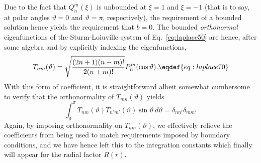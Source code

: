 Due to the fact that $Q^m_n(\xi)$ is unbounded at $\xi=1$ and $\xi=-1$ (that is
to say, at polar angles $\vartheta=0$ and $\vartheta=\pi$, respectively), the
requirement of a bounded solution hence yields the requirement that $b=0$. The
bounded {\it orthonormal} eigenfunctions
of the Sturm-Loiuville system of Eq.~\eqref{eq:laplace50} are hence, after
some algebra and by explicitly indexing the eigenfunctions,
$$
  T_{nm}(\vartheta)=
    \sqrt{{{(2n+1)(n-m)!}\over{2(n+m)!}}}P^m_n(\cos\vartheta).
  \eqdef{eq:laplace70}
$$
With this form of coefficient, it is straightforward albeit somewhat cumbersome
to verify that the orthonormality of $T_{mn}(\vartheta)$ yields
$$
  \int^{\pi}_0
    T_{nm}(\vartheta) T_{n'm'}(\vartheta)\sin\vartheta
  \,d\vartheta
  =\delta_{nn'}\delta_{mm'}
$$
Again, by imposing orthonormality on $T_{nm}(\vartheta)$, we effectively
relieve the coefficients from being used to match requirements imposed by
boundary conditions, and we have hence left this to the integration constants
which finally will appear for the radial factor $R(r)$.

